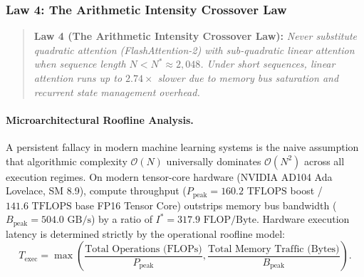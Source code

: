 \subsubsection{Law 4: The Arithmetic Intensity Crossover Law}
\label{sec:law4_arithmetic_crossover}

\begin{quote}
\textbf{Law 4 (The Arithmetic Intensity Crossover Law):} \emph{Never substitute quadratic attention (FlashAttention-2) with sub-quadratic linear attention when sequence length $N < N^* \approx 2{,}048$. Under short sequences, linear attention runs up to $2.74\times$ slower due to memory bus saturation and recurrent state management overhead.}
\end{quote}

\paragraph{Microarchitectural Roofline Analysis.}
A persistent fallacy in modern machine learning systems is the naive assumption that algorithmic complexity $\mathcal{O}(N)$ universally dominates $\mathcal{O}(N^2)$ across all execution regimes. On modern tensor-core hardware (NVIDIA AD104 Ada Lovelace, SM 8.9), compute throughput ($P_{\text{peak}} = 160.2\text{ TFLOPS}$ boost / $141.6\text{ TFLOPS}$ base FP16 Tensor Core) outstrips memory bus bandwidth ($B_{\text{peak}} = 504.0\text{ GB/s}$) by a ratio of $I^* = 317.9\text{ FLOP/Byte}$. Hardware execution latency is determined strictly by the operational roofline model:
\begin{equation}
T_{\text{exec}} = \max\left(\frac{\text{Total Operations (FLOPs)}}{P_{\text{peak}}}, \frac{\text{Total Memory Traffic (Bytes)}}{B_{\text{peak}}}\right).
\end{equation}

